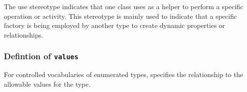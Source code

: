 \FloatBarrier

The use stereotype indicates that one class uses as a helper to perform 
a specific operation or activity. This stereotype is mainly used to indicate
that a specific factory is being employed by another type to create dynamic
properties or relationships.

\subsubsection{Defintion of  \texttt{values}} \label{type:values}

\FloatBarrier

For controlled vocabularies of enumerated types, specifies the relationship to the allowable 
values for the type.

